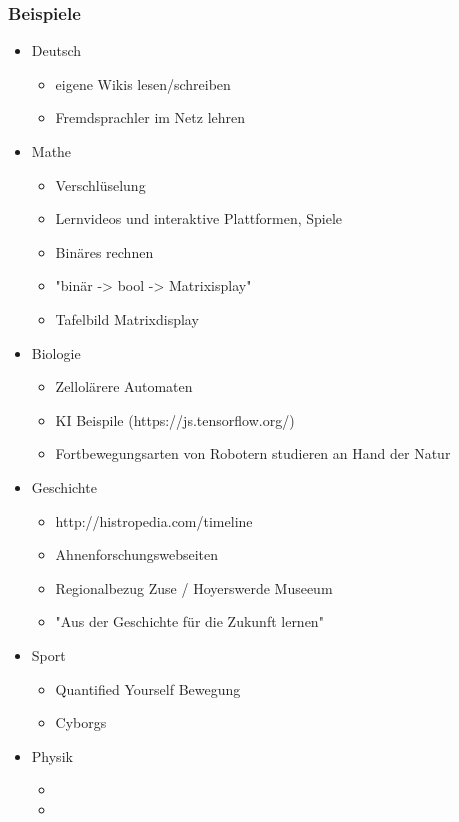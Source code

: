 \documentclass[12pt]{beamer}
\begin{document}
\begin{frame}
	\frametitle{Beispiele}
	\begin{itemize}
		\item<1-> Deutsch
			\begin{itemize}
				\item<1-> eigene Wikis lesen/schreiben
				\item<2-> Fremdsprachler im Netz lehren
			\end{itemize}
		\item<2-> Mathe
			\begin{itemize}
				\item<2-> Verschlüselung
				\item<1-> Lernvideos und interaktive Plattformen, Spiele
				\item<2-> Binäres rechnen
				\item<2-> "binär -> bool -> Matrixisplay"
				\item<2-> Tafelbild Matrixdisplay
			\end{itemize}
		\item<2-> Biologie
			\begin{itemize}
				\item<1-> Zellolärere Automaten
				\item<2-> KI Beispile (https://js.tensorflow.org/)
				\item<2-> Fortbewegungsarten von Robotern studieren an Hand der Natur
			\end{itemize}
		\item<2-> Geschichte
			\begin{itemize}
				\item<1-> http://histropedia.com/timeline
				\item<2-> Ahnenforschungswebseiten
				\item<2-> Regionalbezug Zuse / Hoyerswerde Museeum
				\item<2-> "Aus der Geschichte für die Zukunft lernen"
			\end{itemize}
		\item<2-> Sport
			\begin{itemize}
				\item<1-> Quantified Yourself Bewegung
				\item<2-> Cyborgs
			\end{itemize}
		\item<2-> Physik
			\begin{itemize}
				\item<1-> 
				\item<2-> 
			\end{itemize}
	\end{itemize}
\end{frame}
\end{document}
